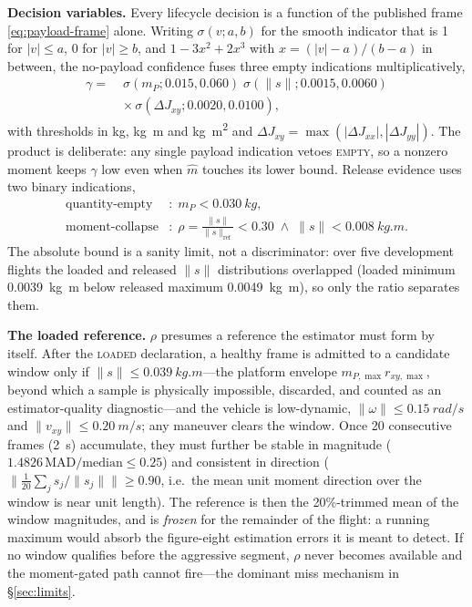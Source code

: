 \documentclass[conference]{IEEEtran}
\begin{document}
\textbf{Decision variables.} Every lifecycle decision is a function of the published frame
\eqref{eq:payload-frame} alone. Writing $\sigma(v;a,b)$ for the smooth indicator that is 1 for
$|v|\le a$, 0 for $|v|\ge b$, and $1-3x^2+2x^3$ with $x=(|v|-a)/(b-a)$ in between, the
no-payload confidence fuses three empty indications multiplicatively,
\begin{equation}
\begin{aligned}
\gamma=\;&\sigma(m_P;0.015,0.060)\;\sigma(\lVert s\rVert;0.0015,0.0060)\\
         &\times\,\sigma(\Delta J_{xy};0.0020,0.0100),
\end{aligned}
\label{eq:gamma}
\end{equation}
with thresholds in \si{kg}, \si{kg.m} and \si{kg.m^2} and
$\Delta J_{xy}=\max(|\Delta J_{xx}|,|\Delta J_{yy}|)$. The product is deliberate: any single
payload indication vetoes \textsc{empty}, so a nonzero moment keeps $\gamma$ low even when
$\hat m$ touches its lower bound. Release evidence uses two binary indications,
\begin{equation}
\begin{aligned}
\text{quantity-empty}&:\; m_P<\SI{0.030}{kg},\\
\text{moment-collapse}&:\; \rho=\frac{\lVert s\rVert}{\lVert s\rVert_{\mathrm{ref}}}<0.30
   \;\wedge\; \lVert s\rVert<\SI{0.008}{kg.m}.
\end{aligned}
\label{eq:release-evidence}
\end{equation}
The absolute bound is a sanity limit, not a discriminator: over five development flights the
loaded and released $\lVert s\rVert$ distributions overlapped (loaded minimum \SI{0.0039}{kg.m}
below released maximum \SI{0.0049}{kg.m}), so only the ratio separates them.

\textbf{The loaded reference.} $\rho$ presumes a reference the estimator must form by itself.
After the \textsc{loaded} declaration, a healthy frame is admitted to a candidate window only if
$\lVert s\rVert\le\SI{0.039}{kg.m}$---the platform envelope $m_{P,\max}r_{xy,\max}$, beyond
which a sample is physically impossible, discarded, and counted as an estimator-quality
diagnostic---and the vehicle is low-dynamic, $\lVert\omega\rVert\le\SI{0.15}{rad/s}$ and
$\lVert v_{xy}\rVert\le\SI{0.20}{m/s}$; any maneuver clears the window. Once 20 consecutive
frames (\SI{2}{s}) accumulate, they must further be stable in magnitude
($1.4826\,\mathrm{MAD}/\mathrm{median}\le0.25$) and consistent in direction
($\lVert\frac1{20}\sum_j s_j/\lVert s_j\rVert\rVert\ge0.90$, i.e.\ the mean unit moment
direction over the window is near unit length). The reference is then the 20\%-trimmed mean
of the window magnitudes, and is \emph{frozen} for the remainder of the flight: a running
maximum would absorb the figure-eight estimation errors it is meant to detect. If no window
qualifies before the aggressive segment, $\rho$ never becomes available and the moment-gated
path cannot fire---the dominant miss mechanism in \S\ref{sec:limits}.
\end{document}
